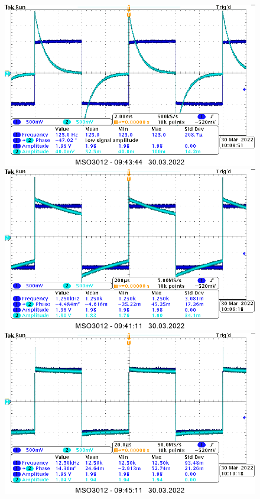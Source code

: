 \begin{figure}[H]
    \centering
    \includegraphics[scale=0.25]{img_osciloscope/CR_pros_troj/CR_prostokatna_mniejsze_tau_cropped.png}
    \includegraphics[scale=0.25]{img_osciloscope/CR_pros_troj/CR_prostokatna_rowne_tau_cropped.png}
    \includegraphics[scale=0.25]{img_osciloscope/CR_pros_troj/CR_prostokatna_wieksze_tau_cropped.png}
    \label{fig:CR_trojkatna}
\end{figure}

